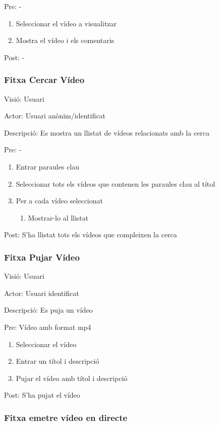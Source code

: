 \documentclass[12pt, titlepage]{article}
\begin{document}
Pre: -

\begin{enumerate}
\item Seleccionar el vídeo a visualitzar
\item Mostra el vídeo i els comentaris
\end{enumerate}

Post: -

\subsubsection{Fitxa Cercar Vídeo}

Visió: Usuari

Actor: Usuari anònim/identificat

Descripció: Es mostra un llistat de vídeos relacionats amb la cerca

Pre: -

\begin{enumerate}
\item Entrar paraules clau
\item Seleccionar tots els vídeos que contenen les paraules clau al títol
\item Per a cada vídeo seleccionat
\begin{enumerate}
\item Mostrar-lo al llistat
\end{enumerate}
\end{enumerate}

Post: S’ha llistat tots els vídeos que compleixen la cerca

\subsubsection{Fitxa Pujar Vídeo}

Visió: Usuari

Actor: Usuari identificat

Descripció: Es puja un vídeo

Pre: Vídeo amb format mp4

\begin{enumerate}
\item Seleccionar el vídeo
\item Entrar un títol i descripció
\item Pujar el vídeo amb títol i descripció
\end{enumerate}

Post: S’ha pujat el vídeo

\subsubsection{Fitxa emetre vídeo en directe}
\end{document}
